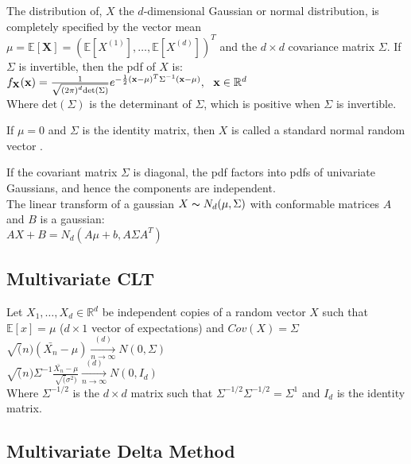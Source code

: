 The distribution of, $X$ the $d$-dimensional Gaussian or normal distribution, is completely specified by the vector mean $\mu =\mathbb E[\mathbf{X}]= (\mathbb E[X^{(1)}],\ldots ,\mathbb E[X^{(d)}])^ T$ and the $d \times d$ covariance matrix $\Sigma$. If $\Sigma$ is invertible, then the pdf of $X$ is:\\

$   f_{\mathbf X}(\mathbf x) = \frac{1}{\sqrt{\left(2\pi \right)^ d \text {det}(\Sigma )}}e^{-\frac{1}{2}(\mathbf x-\mu )^ T \Sigma ^{-1} (\mathbf x-\mu )}, ~ ~ ~ \\ \mathbf x\in \mathbb {R}^ d$\\


Where $\text {det}(\Sigma )$ is the determinant of $\Sigma$, which is positive when $\Sigma$ is invertible.

If $\mu = 0$ and $\Sigma$ is the identity matrix, then $X$ is called a standard normal random vector .

If the covariant matrix $\Sigma$ is diagonal, the pdf factors into pdfs of univariate Gaussians, and hence the components are independent.\\

The linear transform of a gaussian $X \thicksim N_d(\mu,\Sigma)$ with conformable matrices $A$ and $B$ is a gaussian:\\ 

$AX + B = N_d(A\mu + b, A \Sigma A^T)$

\subsection*{Multivariate CLT}

Let $X_1, \ldots, X_d \in \mathbb{R}^d$ be independent copies of a random vector $X$
such that $\mathbb{E}[x] = \mu$ ($d \times 1$ vector of expectations) and $Cov(X)= \Sigma$\\

$\sqrt(n)(\bar{X_n}-\mu) \xrightarrow[n \rightarrow \infty]{(d)} N(0,\Sigma)$\\

$\sqrt(n) \Sigma^{-1} \frac{\bar{X_n}-\mu}{\sqrt(\sigma^2)} \xrightarrow[n \rightarrow \infty]{(d)} N(0,I_d)$\\

Where $\Sigma^{-1/2}$ is the $d \times d$ matrix such that $\Sigma^{-1/2} \Sigma^{-1/2} = \Sigma^{1}$ and $I_d$ is the identity matrix.\\

\subsection*{Multivariate Delta Method}

